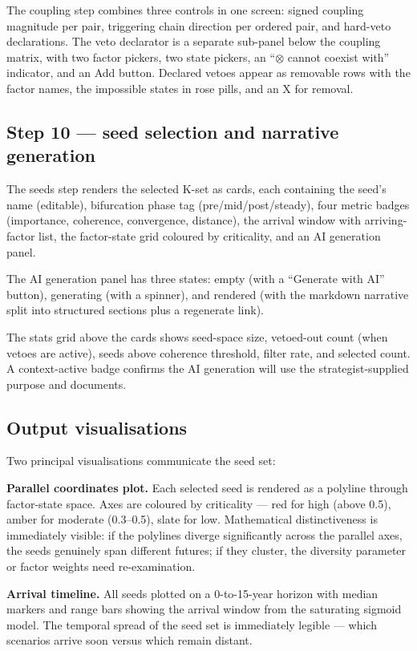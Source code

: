 \documentclass[11pt,a4paper]{article}
\begin{document}
The coupling step combines three controls in one screen: signed coupling magnitude per pair, triggering chain direction per ordered pair, and hard-veto declarations. The veto declarator is a separate sub-panel below the coupling matrix, with two factor pickers, two state pickers, an ``$\otimes$ cannot coexist with'' indicator, and an Add button. Declared vetoes appear as removable rows with the factor names, the impossible states in rose pills, and an X for removal.

\subsection{Step 10 — seed selection and narrative generation}

The seeds step renders the selected K-set as cards, each containing the seed's name (editable), bifurcation phase tag (pre/mid/post/steady), four metric badges (importance, coherence, convergence, distance), the arrival window with arriving-factor list, the factor-state grid coloured by criticality, and an AI generation panel.

The AI generation panel has three states: empty (with a ``Generate with AI'' button), generating (with a spinner), and rendered (with the markdown narrative split into structured sections plus a regenerate link).

The stats grid above the cards shows seed-space size, vetoed-out count (when vetoes are active), seeds above coherence threshold, filter rate, and selected count. A context-active badge confirms the AI generation will use the strategist-supplied purpose and documents.

\subsection{Output visualisations}

Two principal visualisations communicate the seed set:

\textbf{Parallel coordinates plot.} Each selected seed is rendered as a polyline through factor-state space. Axes are coloured by criticality — red for high (above 0.5), amber for moderate (0.3--0.5), slate for low. Mathematical distinctiveness is immediately visible: if the polylines diverge significantly across the parallel axes, the seeds genuinely span different futures; if they cluster, the diversity parameter or factor weights need re-examination.

\textbf{Arrival timeline.} All seeds plotted on a 0-to-15-year horizon with median markers and range bars showing the arrival window from the saturating sigmoid model. The temporal spread of the seed set is immediately legible — which scenarios arrive soon versus which remain distant.
\end{document}
